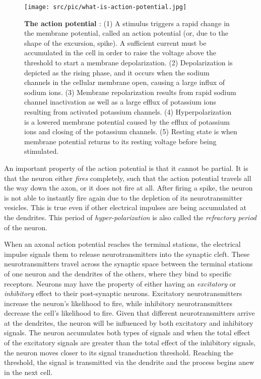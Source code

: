 \begin{figure}[ht!]
  \centering
  \texttt{[image: src/pic/what-is-action-potential.jpg]}
  \caption{\textbf{The action potential \citep[taken from][]{what-action-potential}}: (1) A stimulus triggers a rapid change in the membrane potential, called an action potential (or, due to the shape of the excursion, spike). A sufficient current must be accumulated in the cell in order to raise the voltage above the threshold to start a membrane depolarization. (2) Depolarization is depicted as the rising phase, and it occurs when the sodium channels in the cellular membrane open, causing a large influx of sodium ions. (3) Membrane repolarization results from rapid sodium channel inactivation as well as a large efflux of potassium ions resulting from activated potassium channels. (4) Hyperpolarization is a lowered membrane potential caused by the efflux of potassium ions and closing of the potassium channels. (5) Resting state is when membrane potential returns to its resting voltage before being stimulated.}
  \label{fig:action_potential}
\end{figure}


An important property of the action potential is that it cannot be partial. It is that the neuron either \emph{fires} completely, such that the action potential travels all the way down the axon, or it does not fire at all. After firing a spike, the neuron is not able to instantly fire again due to the depletion of its neurotransmitter vesicles. This is true even if other electrical impulses are being accumulated at the dendrites. This period of \emph{hyper-polarization} is also called the \emph{refractory period} of the neuron.

When an axonal action potential reaches the terminal stations, the electrical impulse signals them to release neurotransmitters into the synaptic cleft. These neurotransmitters travel across the synaptic space between the terminal stations of one neuron and the dendrites of the others, where they bind to specific receptors. Neurons may have the property of either having an \emph{excitatory} or \emph{inhibitory} effect to their post-synaptic neurons. Excitatory neurotransmitters increase the neuron's likelihood to fire, while inhibitory neurotransmitters decrease the cell's likelihood to fire. Given that different neurotransmitters arrive at the dendrites, the neuron will be influenced by both excitatory and inhibitory signals. The neuron accumulates both types of signals and when the total effect of the excitatory signals are greater than the total effect of the inhibitory signals, the neuron moves closer to its signal transduction threshold. Reaching the threshold, the signal is transmitted via the dendrite and the process begins anew in the next cell.

